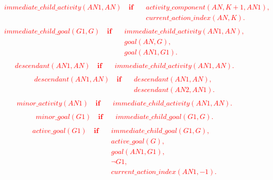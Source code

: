 \documentclass[11pt, oneside]{article}
\begin{document}
\textcolor{red}{
\begin{align}\begin{split}
immediate\_child\_activity(AN1, AN) \quad \mathbf{if}\quad & activity\_component(AN, K+1, AN1), \\
&current\_action\_index(AN, K).
\end{split}\end{align}
\begin{align}\begin{split}
immediate\_child\_goal(G1, G) \quad \mathbf{if}\quad & immediate\_child\_activity(AN1, AN), \\
&goal(AN, G),\\
&goal(AN1, G1).
\end{split}\end{align}
\begin{align}\begin{split}
descendant(AN1, AN) \quad \mathbf{if}\quad & immediate\_child\_activity(AN1, AN).
\end{split}\end{align}
\begin{align}\begin{split}
descendant(AN1, AN) \quad \mathbf{if}\quad & descendant(AN1, AN), \\
&descendant(AN2, AN1).
\end{split}\end{align}
\begin{align}\begin{split}
minor\_activity(AN1) \quad \mathbf{if}\quad & immediate\_child\_activity(AN1, AN).
\end{split}\end{align}
\begin{align}\begin{split}
minor\_goal(G1) \quad \mathbf{if}\quad & immediate\_child\_goal(G1, G).
\end{split}\end{align}
\begin{align}\begin{split}
active\_goal(G1) \quad \mathbf{if}\quad & immediate\_child\_goal(G1, G), \\
&active\_goal(G), \\
&goal(AN1, G1), \\
&\neg G1, \\
&current\_action\_index(AN1, -1).
\end{split}\end{align}
\begin{align}\begin{split}

\end{split}
\end{align}}
\end{document}
